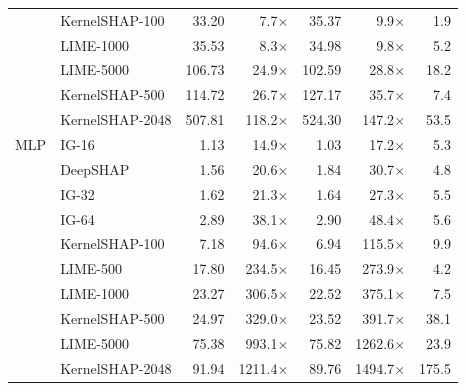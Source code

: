 \begin{table}[!htbp]
\begin{tabular}{llrrrrr}
 & KernelSHAP-100 & 33.20 & 7.7$\times$ & 35.37 & 9.9$\times$ & 1.9 \\
 & LIME-1000 & 35.53 & 8.3$\times$ & 34.98 & 9.8$\times$ & 5.2 \\
 & LIME-5000 & 106.73 & 24.9$\times$ & 102.59 & 28.8$\times$ & 18.2 \\
 & KernelSHAP-500 & 114.72 & 26.7$\times$ & 127.17 & 35.7$\times$ & 7.4 \\
 & KernelSHAP-2048 & 507.81 & 118.2$\times$ & 524.30 & 147.2$\times$ & 53.5 \\
\midrule
MLP & IG-16 & 1.13 & 14.9$\times$ & 1.03 & 17.2$\times$ & 5.3 \\
 & DeepSHAP & 1.56 & 20.6$\times$ & 1.84 & 30.7$\times$ & 4.8 \\
 & IG-32 & 1.62 & 21.3$\times$ & 1.64 & 27.3$\times$ & 5.5 \\
 & IG-64 & 2.89 & 38.1$\times$ & 2.90 & 48.4$\times$ & 5.6 \\
 & KernelSHAP-100 & 7.18 & 94.6$\times$ & 6.94 & 115.5$\times$ & 9.9 \\
 & LIME-500 & 17.80 & 234.5$\times$ & 16.45 & 273.9$\times$ & 4.2 \\
 & LIME-1000 & 23.27 & 306.5$\times$ & 22.52 & 375.1$\times$ & 7.5 \\
 & KernelSHAP-500 & 24.97 & 329.0$\times$ & 23.52 & 391.7$\times$ & 38.1 \\
 & LIME-5000 & 75.38 & 993.1$\times$ & 75.82 & 1262.6$\times$ & 23.9 \\
 & KernelSHAP-2048 & 91.94 & 1211.4$\times$ & 89.76 & 1494.7$\times$ & 175.5 \\
\bottomrule
\end{tabular}
\end{table}
